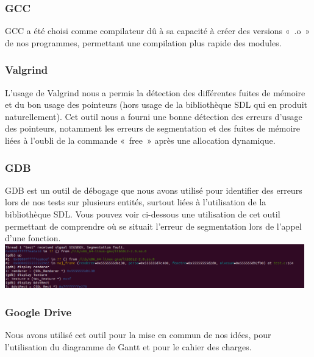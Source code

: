 \documentclass[12pt,a4paper]{article}
\begin{document}
            \subsubsection{GCC}
                \tabto{1cm} GCC a été choisi comme compilateur dû à sa capacité à créer des versions «~.o~» de nos programmes, permettant une compilation plus rapide des modules.
            
            \subsubsection{Valgrind}
                \tabto{1cm} L’usage de Valgrind nous a permis la détection des différentes fuites de mémoire et du bon usage des pointeurs (hors usage de la bibliothèque SDL qui en produit naturellement). Cet outil nous a fourni une bonne détection des erreurs d’usage des pointeurs, notamment les erreurs de segmentation et des fuites de mémoire liées à l’oubli de la commande «~free~» après une allocation dynamique.
                
            \subsubsection{GDB}
                \tabto{1cm} GDB est un outil de débogage que nous avons utilisé pour identifier des erreurs lors de nos tests sur plusieurs entités, surtout liées à l’utilisation de la bibliothèque SDL. Vous pouvez voir ci-dessous une utilisation de cet outil permettant de comprendre où se situait l’erreur de segmentation lors de l’appel d’une fonction.\\

                \includegraphics[width=13cm]{images/debogage.png}\\
                
            \subsubsection{Google Drive}
                \tabto{1cm} Nous avons utilisé cet outil pour la mise en commun de nos idées, pour l’utilisation du diagramme de Gantt et pour le cahier des charges.
\end{document}
